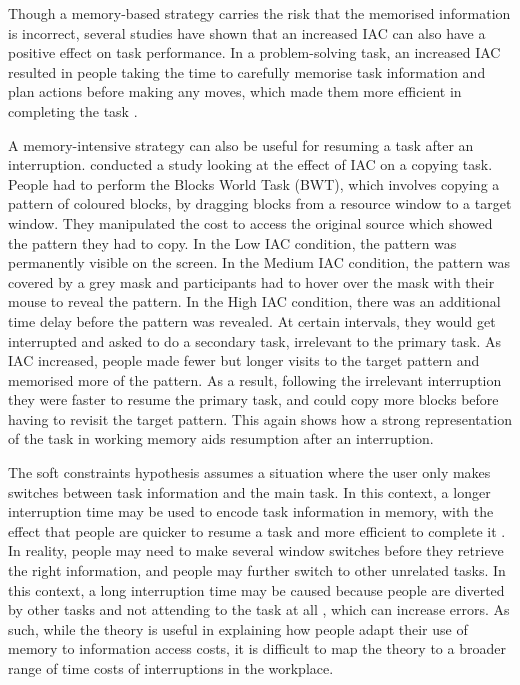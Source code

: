 Though a memory-based strategy carries the risk that the memorised information is incorrect, several studies have shown that an increased IAC can also have a positive effect on task performance. In a problem-solving task, an increased IAC resulted in people taking the time to carefully memorise task information and plan actions before making any moves, which made them more efficient in completing the task \citep[e.g.][]{Morgan2007, Morgan2012}. 

A memory-intensive strategy can also be useful for resuming a task after an interruption. \citet{Morgan2009} conducted a study looking at the effect of IAC on a copying task. People had to perform the Blocks World Task (BWT), which involves copying a pattern of coloured blocks, by dragging blocks from a resource window to a target window. They manipulated the cost to access the original source which showed the pattern they had to copy. In the Low IAC condition, the pattern was permanently visible on the screen. In the Medium IAC condition, the pattern was covered by a grey mask and participants had to hover over the mask with their mouse to reveal the pattern. In the High IAC condition, there was an additional time delay before the pattern was revealed. At certain intervals, they would get interrupted and asked to do a secondary task, irrelevant to the primary task. As IAC increased, people made fewer but longer visits to the target pattern and memorised more of the pattern. As a result, following the irrelevant interruption they were faster to resume the primary task, and could copy more blocks before having to revisit the target pattern. This again shows how a strong representation of the task in working memory aids resumption after an interruption.

The soft constraints hypothesis assumes a situation where the user only makes switches between task information and the main task. In this context, a longer interruption time may be used to encode task information in memory, with the effect that people are quicker to resume a task and more efficient to complete it \citep{Morgan2007, Morgan2012}. In reality, people may need to make several window switches before they retrieve the right information, and people may further switch to other unrelated tasks. In this context, a long interruption time may be caused because people are diverted by other tasks and not attending to the task at all \citep{Iqbal2008}, which can increase errors. As such, while the theory is useful in explaining how people adapt their use of memory to information access costs, it is difficult to map the theory to a broader range of time costs of interruptions in the workplace. 


